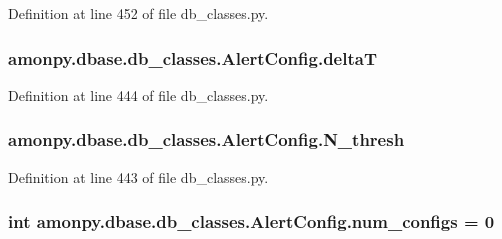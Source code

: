 Definition at line 452 of file db\-\_\-classes.\-py.

\hypertarget{classamonpy_1_1dbase_1_1db__classes_1_1_alert_config_ae6ec661f2f82ef7d84f6285a6feacaa9}{
\subsubsection[{delta\-T}]{\setlength{\rightskip}{0pt plus 5cm}amonpy.\-dbase.\-db\-\_\-classes.\-Alert\-Config.\-delta\-T}}\label{classamonpy_1_1dbase_1_1db__classes_1_1_alert_config_ae6ec661f2f82ef7d84f6285a6feacaa9}


Definition at line 444 of file db\-\_\-classes.\-py.

\hypertarget{classamonpy_1_1dbase_1_1db__classes_1_1_alert_config_aec4a19cdc1a4fa7269378278fe36bce3}{
\subsubsection[{N\-\_\-thresh}]{\setlength{\rightskip}{0pt plus 5cm}amonpy.\-dbase.\-db\-\_\-classes.\-Alert\-Config.\-N\-\_\-thresh}}\label{classamonpy_1_1dbase_1_1db__classes_1_1_alert_config_aec4a19cdc1a4fa7269378278fe36bce3}


Definition at line 443 of file db\-\_\-classes.\-py.

\hypertarget{classamonpy_1_1dbase_1_1db__classes_1_1_alert_config_ad02d71bf530446fdd3e8e87fb82bafb8}{
\subsubsection[{num\-\_\-configs}]{\setlength{\rightskip}{0pt plus 5cm}int amonpy.\-dbase.\-db\-\_\-classes.\-Alert\-Config.\-num\-\_\-configs = 0\hspace{0.3cm}{\ttfamily [static]}}}\label{classamonpy_1_1dbase_1_1db__classes_1_1_alert_config_ad02d71bf530446fdd3e8e87fb82bafb8}


